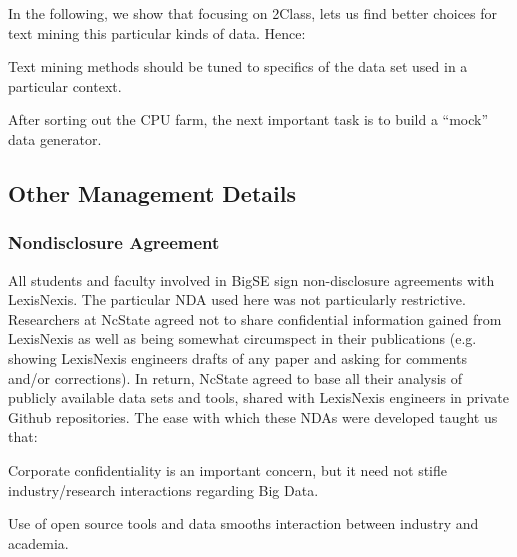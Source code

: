 \documentclass{sig-alternate-05-2015}
\theoremstyle{break}
\begin{document}
In the following, we show that   focusing on 2Class,
lets us find better choices for text mining this particular
kinds of data. Hence:
\begin{lesson}
Text mining methods should be tuned to specifics
of the data set used in a particular context.
\end{lesson}  
\begin{lesson}
After sorting out the CPU farm, the next  important task is to
build a ``mock'' data generator.
\end{lesson} 



\subsection{Other Management Details}

\subsubsection{Nondisclosure Agreement}

All students and faculty involved in BigSE
 sign non-disclosure agreements with LexisNexis. The particular NDA used
 here was not particularly restrictive. Researchers at NcState agreed not to share confidential
 information gained from LexisNexis as well as being somewhat circumspect in their publications
 (e.g. showing LexisNexis engineers drafts of any paper and asking for comments and/or
 corrections).  In return, NcState agreed to base all their analysis of   publicly
 available data sets and tools, shared with LexisNexis engineers in private Github repositories.  The ease
 with which these NDAs were developed taught us that:
 \begin{lesson}
Corporate confidentiality is an important
concern, but it need not   stifle
industry/research interactions regarding Big Data.
\end{lesson} 
\begin{lesson}
Use of open source tools and data smooths interaction
between industry and academia.
\end{lesson}
\end{document}
